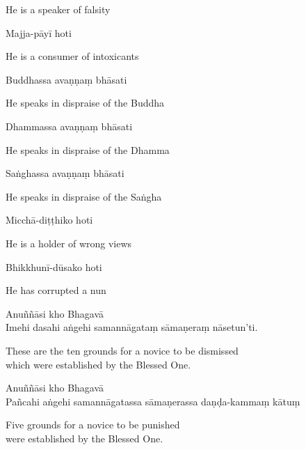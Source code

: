 \begin{english}
  He is a speaker of falsity
\end{english}

Majja-pāyī hoti

\begin{english}
  He is a consumer of intoxicants
\end{english}

Buddhassa avaṇṇaṃ bhāsati

\begin{english}
  He speaks in dispraise of the Buddha
\end{english}

Dhammassa avaṇṇaṃ bhāsati

\begin{english}
  He speaks in dispraise of the Dhamma
\end{english}

Saṅghassa avaṇṇaṃ bhāsati

\begin{english}
  He speaks in dispraise of the Saṅgha
\end{english}

Micchā-diṭṭhiko hoti

\begin{english}
  He is a holder of wrong views
\end{english}

Bhikkhunī-dūsako hoti

\begin{english}
  He has corrupted a nun
\end{english}

Anuññāsi kho Bhagavā\\
Imehi dasahi aṅgehi samannāgataṃ sāmaṇeraṃ nāsetun'ti.

\begin{english}
  These are the ten grounds for a novice to be dismissed\\
  which were established by the Blessed One.
\end{english}


Anuññāsi kho Bhagavā\\
Pañcahi aṅgehi samannāgatassa sāmaṇerassa daṇḍa-kammaṃ kātuṃ

\begin{english}
  Five grounds for a novice to be punished\\
  were established by the Blessed One.
\end{english}

